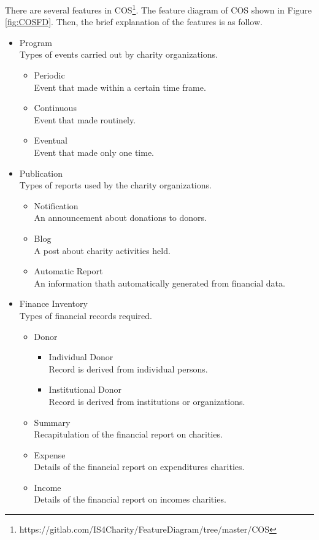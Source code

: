 There are several features in COS\footnote{https://gitlab.com/IS4Charity/FeatureDiagram/tree/master/COS}. The feature diagram of COS shown in Figure \ref{fig:COSFD}. Then, the brief explanation of the features is as follow.

\begin{itemize}
	
	\item Program \\
	Types of events carried out by charity organizations.
	\begin{itemize}
		\item Periodic \\
		Event that made within a certain time frame.
		\item Continuous \\
		Event that made routinely.
		\item Eventual \\
		Event that made only one time.
	\end{itemize}
	
	\item Publication \\
	Types of reports used by the charity organizations.
	\begin{itemize}
		\item Notification \\
		An announcement about donations to donors.
		\item Blog \\
		A post about charity activities held.
		\item Automatic Report \\
		An information thath automatically generated from financial data.
	\end{itemize}
	
	\item Finance Inventory \\
	Types of financial records required.
	\begin{itemize}
		\item Donor
		\begin{itemize}
			\item Individual Donor \\
			Record is derived from individual persons.
			\item Institutional Donor \\
			Record is derived from institutions or organizations.
		\end{itemize}
		\item Summary \\
		Recapitulation of the financial report on charities.
		\item Expense \\
		Details of the financial report on expenditures charities.
		\item Income \\
		Details of the financial report on incomes charities.
	\end{itemize}
	

\end{itemize}

